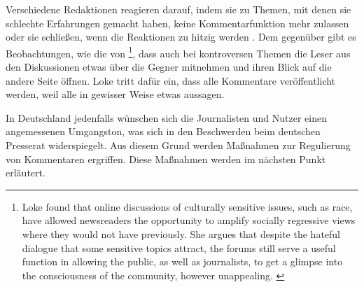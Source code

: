 Verschiedene Redaktionen reagieren darauf, indem sie zu Themen, mit denen sie
schlechte Erfahrungen gemacht haben, keine Kommentarfunktion mehr zulassen oder
sie schließen, wenn die Reaktionen zu hitzig werden
\autocite[S.~4]{santana:2014}. Dem gegenüber gibt es Beobachtungen, wie die von
\textcite{loke}\footnote{\glqq Loke found that online discussions of culturally
sensitive issues, such as race, have allowed newsreaders the opportunity to
amplify socially regressive views where they would not have previously. She
argues that despite the hateful dialogue that some sensitive topics attract, the
forums still serve a useful function in allowing the public, as well as
journalists, to get a glimpse into the consciousness of the community, however
unappealing.\grqq\- \autocite[S.~12]{santana:2014}}, dass auch bei kontroversen
Themen die Leser aus den Diskussionen etwas über die Gegner mitnehmen und ihren
Blick auf die andere Seite öffnen. Loke tritt dafür ein, dass alle Kommentare
veröffentlicht werden, weil alle in gewisser Weise etwas aussagen.

In Deutschland jedenfalls wünschen sich die Journalisten und Nutzer einen
angemessenen Umgangston, was sich in den Beschwerden beim deutschen Presserat
widerspiegelt. Aus diesem Grund werden Maßnahmen zur Regulierung von Kommentaren
ergriffen. Diese Maßnahmen werden im nächsten Punkt erläutert.

